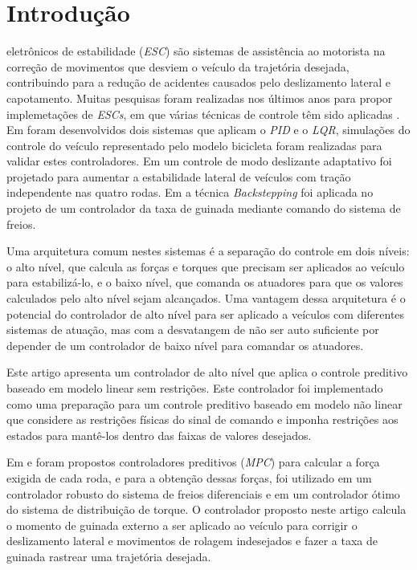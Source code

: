 \section{Introdução}
 
 eletrônicos de estabilidade
(\emph{ESC}) são sistemas de assistência ao motorista na correção de movimentos que desviem o veículo da
trajetória desejada, contribuindo para a redução de acidentes causados
pelo deslizamento lateral e capotamento. 
Muitas pesquisas foram realizadas nos últimos anos para propor implemetações de
\emph{ESCs}, em que várias técnicas de controle têm sido aplicadas
\cite{Zhang2016, Zhai2016, Yuan2016,Li2017, Nahidi2017, Jin2017a, Jalali2017, Niaona2017, Guo2017}.
Em \cite{Yogurtcu2015} foram desenvolvidos dois sistemas que aplicam o
\emph{PID} e o \emph{LQR}, simulações do controle do veículo representado pelo
modelo bicicleta foram realizadas para validar estes controladores.
Em \cite{Subroto2017} um controle de modo deslizante adaptativo foi projetado
para aumentar a estabilidade lateral de veículos com tração independente nas quatro rodas.
Em \cite{Zhou2010} a técnica \emph{Backstepping} foi aplicada no projeto
de um controlador da taxa de guinada mediante comando do sistema de freios.

Uma arquitetura comum nestes sistemas é a separação do controle em dois níveis:
o alto nível, que calcula as forças e torques que precisam ser aplicados ao
veículo para estabilizá-lo, e o baixo nível, que
comanda os atuadores para que os valores calculados pelo alto
nível sejam alcançados.
Uma vantagem dessa arquitetura é o potencial
do controlador de alto nível para ser aplicado a veículos com diferentes
sistemas de atuação, mas com a desvatangem de não ser auto suficiente por
depender de um controlador de baixo nível para comandar os atuadores.

Este artigo apresenta um controlador de alto nível que aplica o
controle preditivo baseado em modelo linear sem restrições. Este
controlador foi implementado como uma preparação para um controle preditivo
baseado em modelo não linear que considere as restrições físicas do sinal
de comando e imponha restrições aos estados para mantê-los dentro
das faixas de valores desejados.  

Em \cite{Li2017} e \cite{Nahidi2017} foram propostos
controladores preditivos (\emph{MPC}) para calcular a força exigida de cada
roda, e para a obtenção dessas forças, foi utilizado em \cite{Li2017} um
controlador robusto do sistema de freios diferenciais e em  \cite{Nahidi2017} um
controlador ótimo do sistema de distribuição de torque.
O controlador proposto neste artigo calcula o momento de guinada externo a ser
aplicado ao veículo para corrigir o deslizamento lateral e movimentos de
rolagem indesejados e fazer a taxa de guinada rastrear uma trajetória desejada.

